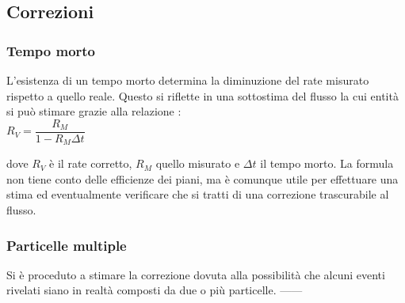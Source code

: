 \documentclass[11pt]{article}
\begin{document}
\subsection{Correzioni}
\subsubsection{Tempo morto}
L'esistenza di un tempo morto determina la diminuzione del rate misurato rispetto a quello reale. Questo si riflette in una sottostima del flusso la cui entità si può stimare grazie alla relazione \cite{correzione_tempomorto}: \\
$
R_V = \dfrac{R_M}{1-R_M \Delta t}
$

dove $R_V$ è il rate corretto, $R_M$ quello misurato e $\Delta t$ il tempo morto. La formula non tiene conto delle efficienze dei piani, ma è comunque utile per effettuare una stima ed eventualmente verificare che si tratti di una correzione trascurabile al flusso.

\subsubsection{Particelle multiple}
Si è proceduto a stimare la correzione dovuta alla possibilità che alcuni eventi rivelati siano in realtà composti da due o più particelle. 
------
\end{document}

